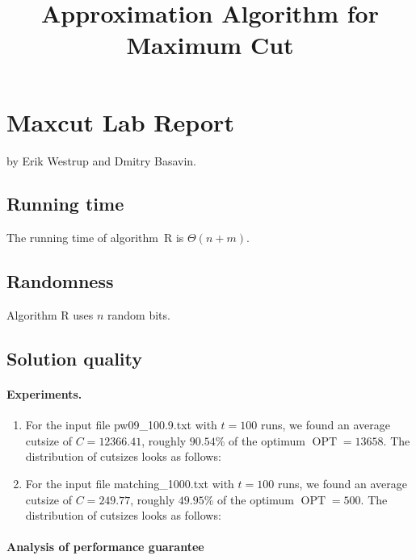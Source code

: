 \documentclass{tufte-handout}
\title{\sf Approximation Algorithm for Maximum Cut}
\begin{document}
\maketitle

\section{Maxcut Lab Report}
by Erik Westrup and Dmitry Basavin.

\subsection{Running time}

The running time of algorithm~R is $\Theta(n + m)$.

\subsection{Randomness}

Algorithm R uses $n$ random bits.

\subsection{Solution quality}

\paragraph{Experiments.}

\begin{enumerate}
\item
For the input file  pw09\_100.9.txt with $t=100$ runs, we found
an average cutsize of $C=12366.41$, roughly $90.54$\% of the optimum
$\operatorname{OPT} = 13658$.
The distribution of cutsizes looks as follows:

\medskip
\noindent


\item
For the input file matching\_1000.txt with $t=100$ runs, we found
an average cutsize of $C=249.77$, roughly $49.95$\% of the optimum
$\operatorname{OPT} = 500$.
The distribution of cutsizes looks as follows:

\medskip
\noindent



\end{enumerate}
\paragraph{Analysis of performance guarantee}
\end{document}
